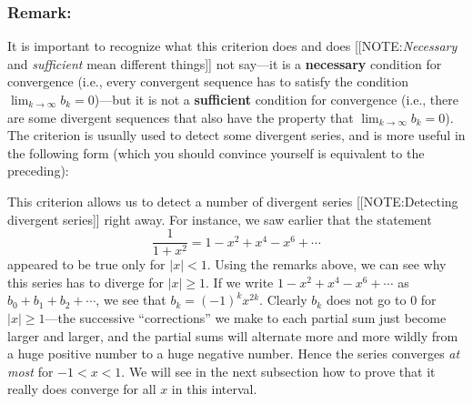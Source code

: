 \begin{center}
\end{center}



\subsubsection{Remark:}
It is important to recognize what this criterion does
and does [[NOTE:{\em Necessary} and {\em sufficient} mean different
  things]] not say---it is a {\bf necessary} condition for convergence
(i.e., every convergent sequence has to satisfy the condition
$\lim_{k\rightarrow \infty} b_k = 0$)---but it is not a {\bf
  sufficient} condition for convergence (i.e., there are some
divergent sequences that also have the property that
$\lim_{k\rightarrow \infty} b_k = 0$).  The criterion is usually used
to detect some divergent series, and is more useful in the following
form (which you should convince yourself is equivalent to the
preceding):


\begin{center}
\end{center}

This criterion allows us to detect a number of divergent series 
[[NOTE:Detecting  divergent series]]
right away.  For instance, we saw earlier that the statement
\[
\dfrac{1}{1+x^2} = 1 - x^2 + x^4 - x^6 + \cdots 
\]
appeared to be true only for $|x|<1$. Using the remarks above, we can
see why this series has to diverge for $|x|\ge 1$.  If we write
$1-x^2+x^4-x^6+\cdots$ as $b_0 + b_1 + b_2 + \cdots$, we see that
$b_k=(-1)^kx^{2k}$.  Clearly $b_k$ does not go to 0 for $|x|\ge
1$---the successive ``corrections'' we make to each partial sum just
become larger and larger, and the partial sums will alternate more and
more wildly from a huge positive number to a huge negative number.
Hence the series converges {\em at most} for $-1<x<1$.  We will see in
the next subsection how to prove that it really does converge for all
$x$ in this interval.

